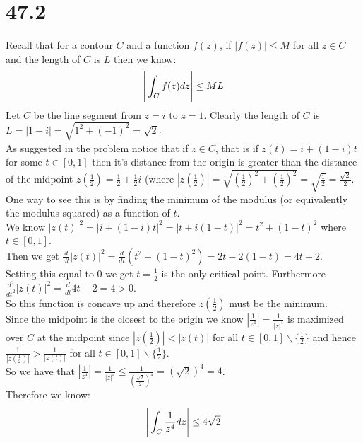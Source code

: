 \documentclass{article}
\begin{document}
\section*{47.2}
\begin{center}
    \doublespacing
    Recall that for a contour $C$ and a function $f(z)$, if $|f(z)|\leq M$ for all $z\in C$ and the length of $C$ is $L$ then we know:
    \[\Bigg{|}\int _C f(z) dz\Bigg{|}\leq ML\]
    Let $C$ be the line segment from $z = i$ to $z = 1$. Clearly the length of $C$ is $L = |1 - i| =\sqrt{1^2 + (-1)^2} =\sqrt{2}$.
    \break
    \\As suggested in the problem notice that if $z\in C$, that is if $z(t) = i + (1 - i)t$ for some $t\in [0, 1]$ then it's distance from the origin is greater than the distance of the midpoint $z(\frac{1}{2}) =\frac{1}{2} +\frac{1}{2} i$ (where $|z(\frac{1}{2})| =\sqrt{(\frac{1}{2})^2 + (\frac{1}{2})^2} =\sqrt{\frac{1}{2}} =\frac{\sqrt{2}}{2}$.
    \break
    \\One way to see this is by finding the minimum of the modulus (or equivalently the modulus squared) as a function of $t$.
    \\We know $|z(t)|^2 = |i + (1 - i)t|^2 = |t + i(1 - t)|^2 = t^2 + (1 - t)^2$ where $t\in [0, 1]$.
    \\Then we get $\frac{d}{dt} |z(t)|^2 =\frac{d}{dt} (t^2 + (1 - t)^2) = 2t - 2(1 - t) = 4t - 2$.
    \\Setting this equal to 0 we get $t =\frac{1}{2}$ is the only critical point. Furthermore $\frac{d^2}{dt^2} |z(t)|^2 =\frac{d}{dt} 4t - 2 = 4 > 0$.
    \\So this function is concave up and therefore $z(\frac{1}{2})$ must be the minimum.
    \break
    \\Since the midpoint is the closest to the origin we know $|\frac{1}{z^4}| =\frac{1}{|z|^4}$ is maximized over $C$ at the midpoint since $|z(\frac{1}{2})| < |z(t)|$ for all $t\in [0, 1]\backslash\{\frac{1}{2}\}$ and hence $\frac{1}{|z(\frac{1}{2})|} >\frac{1}{|z(t)|}$ for all $t\in [0, 1]\backslash\{\frac{1}{2}\}$.
    \break
    \\So we have that $|\frac{1}{z^4}| =\frac{1}{|z|^4}\leq\frac{1}{(\frac{\sqrt{2}}{2})^4} = (\sqrt{2})^4 = 4$.
    \\Therefore we know:
    \[\Bigg{|}\int _C\frac{1}{z^4} dz\Bigg{|}\leq 4\sqrt{2}\] \qedsymbol
\end{center}


\newpage
\end{document}

